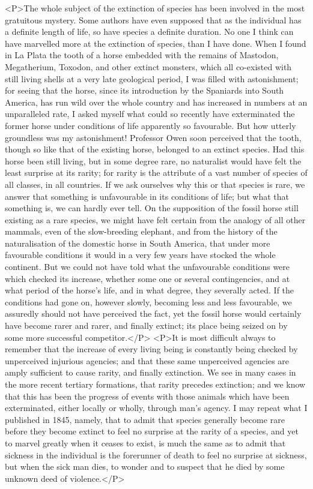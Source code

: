 <P>The whole subject of the extinction of species has been involved in the most gratuitous mystery. Some authors have even supposed that as the individual has a definite length of life, so have species a definite duration. No one I think can have marvelled more at the extinction of species, than I have done. When I found in La Plata the tooth of a horse embedded with the remains of Mastodon, Megatherium, Toxodon, and other extinct monsters, which all co-existed with still living shells at a very late geological period, I was filled with astonishment; for seeing that the horse, since its introduction by the Spaniards into South America, has run wild over the whole country and has increased in numbers at an unparalleled rate, I asked myself what could so recently have exterminated the former horse under conditions of life apparently so favourable. But how utterly groundless was my astonishment! Professor Owen soon perceived that the tooth, though so like that of the existing horse, belonged to an extinct species. Had this horse been still living, but in some degree rare, no naturalist would have felt the least surprise at its rarity; for rarity is the attribute of a vast number of species of all classes, in all countries. If we ask ourselves why this or that species is rare, we answer that something is unfavourable in its conditions of life; but what that something is, we can hardly ever tell. On the supposition of the fossil horse still existing as a rare species, we might have felt certain from the analogy of all other mammals, even of the slow-breeding elephant, and from the history of the naturalisation of the domestic horse in South America, that under more favourable conditions it would in a very few years have stocked the whole continent.  But we could not have told what the unfavourable conditions were which checked its increase, whether some one or several contingencies, and at what period of the horse's life, and in what degree, they severally acted. If the conditions had gone on, however slowly, becoming less and less favourable, we assuredly should not have perceived the fact, yet the fossil horse would certainly have become rarer and rarer, and finally extinct; its place being seized on by some more successful competitor.</P>
<P>It is most difficult always to remember that the increase of every living being is constantly being checked by unperceived injurious agencies; and that these same unperceived agencies are amply sufficient to cause rarity, and finally extinction. We see in many cases in the more recent tertiary formations, that rarity precedes extinction; and we know that this has been the progress of events with those animals which have been exterminated, either locally or wholly, through man's agency. I may repeat what I published in 1845, namely, that to admit that species generally become rare before they become extinct to feel no surprise at the rarity of a species, and yet to marvel greatly when it ceases to exist, is much the same as to admit that sickness in the individual is the forerunner of death to feel no surprise at sickness, but when the sick man dies, to wonder and to suspect that he died by some unknown deed of violence.</P>

